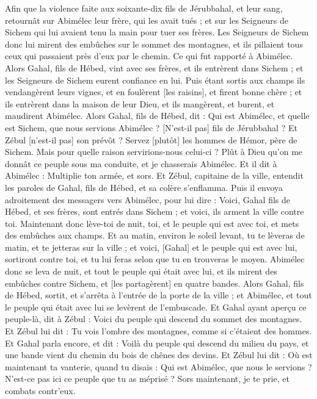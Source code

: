 \begin{multicols}{2}
Afin que la violence faite aux soixante-dix fils de Jérubbahal, et leur sang, retournât sur Abimélec leur frère, qui les avait tués ; et sur les Seigneurs de Sichem qui lui avaient tenu la main pour tuer ses frères.
Les Seigneurs de Sichem donc lui mirent des embûches sur le sommet des montagnes, et ils pillaient tous ceux qui passaient près d'eux par le chemin. Ce qui fut rapporté à Abimélec.
Alors Gahal, fils de Hébed, vint avec ses frères, et ils entrèrent dans Sichem ; et les Seigneurs de Sichem eurent confiance en lui.
Puis étant sortis aux champs ils vendangèrent leurs vignes, et en foulèrent [les raisins], et firent bonne chère ; et ils entrèrent dans la maison de leur Dieu, et ils mangèrent, et burent, et maudirent Abimélec.
Alors Gahal, fils de Hébed, dit : Qui est Abimélec, et quelle est Sichem, que nous servions Abimélec ? [N'est-il pas] fils de Jérubbahal ? Et Zébul [n'est-il pas] son prévôt ? Servez [plutôt] les hommes de Hémor, père de Sichem. Mais pour quelle raison servirions-nous celui-ci ?
Plût à Dieu qu'on me donnât ce peuple sous ma conduite, et je chasserais Abimélec. Et il dit à Abimélec : Multiplie ton armée, et sors.
Et Zébul, capitaine de la ville, entendit les paroles de Gahal, fils de Hébed, et sa colère s'enflamma.
Puis il envoya adroitement des messagers vers Abimélec, pour lui dire : Voici, Gahal fils de Hébed, et ses frères, sont entrés dans Sichem ; et voici, ils arment la ville contre toi.
Maintenant donc lève-toi de nuit, toi, et le peuple qui est avec toi, et mets des embûches aux champs.
Et au matin, environ le soleil levant, tu te lèveras de matin, et te jetteras sur la ville ; et voici, [Gahal] et le peuple qui est avec lui, sortiront contre toi, et tu lui feras selon que tu en trouveras le moyen.
Abimélec donc se leva de nuit, et tout le peuple qui était avec lui, et ils mirent des embûches contre Sichem, et [les partagèrent] en quatre bandes.
Alors Gahal, fils de Hébed, sortit, et s'arrêta à l'entrée de la porte de la ville ; et Abimélec, et tout le peuple qui était avec lui se levèrent de l'embuscade.
Et Gahal ayant aperçu ce peuple-là, dit à Zébul : Voici du peuple qui descend du sommet des montagnes. Et Zébul lui dit : Tu vois l'ombre des montagnes, comme si c'étaient des hommes.
Et Gahal parla encore, et dit : Voilà du peuple qui descend du milieu du pays, et une bande vient du chemin du bois de chênes des devins.
Et Zébul lui dit : Où est maintenant ta vanterie, quand tu disais : Qui est Abimélec, que nous le servions ? N'est-ce pas ici ce peuple que tu as méprisé ? Sors maintenant, je te prie, et combats contr'eux.

\end{multicols}
